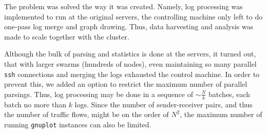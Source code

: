 \documentclass[conference]{IEEEtran}
\begin{document}
The problem was solved the way it was created. Namely, log processing was implemented to run at the original servers, the controlling machine only left to do one-pass log merge and graph drawing. Thus, data harvesting and analysis was made to scale together with the cluster.




Although the bulk of parsing and statistics is done at the servers, it turned out, that with larger swarms (hundreds of nodes), even maintaining so many parallel {\tt ssh} connections and merging the logs exhausted the control machine. In order to prevent this, we added an option to restrict the maximum number of parallel parsings. Thus, log processing may be done in a sequence of $\sim\frac{N}{k}$ batches, each batch no more than $k$ logs.
Since the number of sender-receiver pairs, and thus the number of traffic flows, might be on the order of $N^{2}$, the maximum number of running {\tt gnuplot} instances can also be limited.

\end{document}

